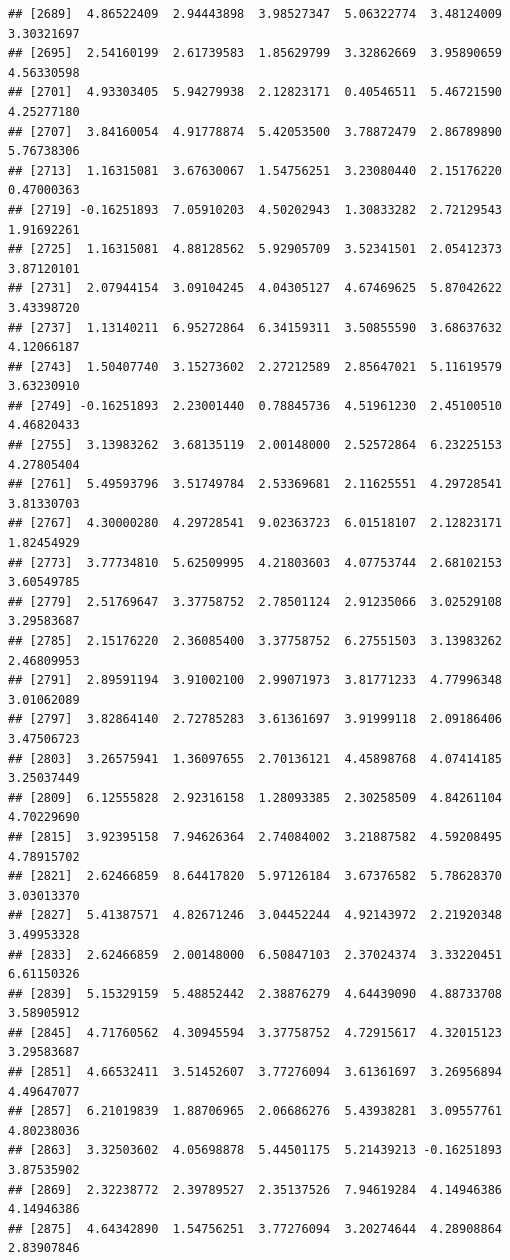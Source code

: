 \documentclass[
]{article}
\begin{document}
\begin{verbatim}
## [2689]  4.86522409  2.94443898  3.98527347  5.06322774  3.48124009  3.30321697
## [2695]  2.54160199  2.61739583  1.85629799  3.32862669  3.95890659  4.56330598
## [2701]  4.93303405  5.94279938  2.12823171  0.40546511  5.46721590  4.25277180
## [2707]  3.84160054  4.91778874  5.42053500  3.78872479  2.86789890  5.76738306
## [2713]  1.16315081  3.67630067  1.54756251  3.23080440  2.15176220  0.47000363
## [2719] -0.16251893  7.05910203  4.50202943  1.30833282  2.72129543  1.91692261
## [2725]  1.16315081  4.88128562  5.92905709  3.52341501  2.05412373  3.87120101
## [2731]  2.07944154  3.09104245  4.04305127  4.67469625  5.87042622  3.43398720
## [2737]  1.13140211  6.95272864  6.34159311  3.50855590  3.68637632  4.12066187
## [2743]  1.50407740  3.15273602  2.27212589  2.85647021  5.11619579  3.63230910
## [2749] -0.16251893  2.23001440  0.78845736  4.51961230  2.45100510  4.46820433
## [2755]  3.13983262  3.68135119  2.00148000  2.52572864  6.23225153  4.27805404
## [2761]  5.49593796  3.51749784  2.53369681  2.11625551  4.29728541  3.81330703
## [2767]  4.30000280  4.29728541  9.02363723  6.01518107  2.12823171  1.82454929
## [2773]  3.77734810  5.62509995  4.21803603  4.07753744  2.68102153  3.60549785
## [2779]  2.51769647  3.37758752  2.78501124  2.91235066  3.02529108  3.29583687
## [2785]  2.15176220  2.36085400  3.37758752  6.27551503  3.13983262  2.46809953
## [2791]  2.89591194  3.91002100  2.99071973  3.81771233  4.77996348  3.01062089
## [2797]  3.82864140  2.72785283  3.61361697  3.91999118  2.09186406  3.47506723
## [2803]  3.26575941  1.36097655  2.70136121  4.45898768  4.07414185  3.25037449
## [2809]  6.12555828  2.92316158  1.28093385  2.30258509  4.84261104  4.70229690
## [2815]  3.92395158  7.94626364  2.74084002  3.21887582  4.59208495  4.78915702
## [2821]  2.62466859  8.64417820  5.97126184  3.67376582  5.78628370  3.03013370
## [2827]  5.41387571  4.82671246  3.04452244  4.92143972  2.21920348  3.49953328
## [2833]  2.62466859  2.00148000  6.50847103  2.37024374  3.33220451  6.61150326
## [2839]  5.15329159  5.48852442  2.38876279  4.64439090  4.88733708  3.58905912
## [2845]  4.71760562  4.30945594  3.37758752  4.72915617  4.32015123  3.29583687
## [2851]  4.66532411  3.51452607  3.77276094  3.61361697  3.26956894  4.49647077
## [2857]  6.21019839  1.88706965  2.06686276  5.43938281  3.09557761  4.80238036
## [2863]  3.32503602  4.05698878  5.44501175  5.21439213 -0.16251893  3.87535902
## [2869]  2.32238772  2.39789527  2.35137526  7.94619284  4.14946386  4.14946386
## [2875]  4.64342890  1.54756251  3.77276094  3.20274644  4.28908864  2.83907846

\end{verbatim}
\end{document}
